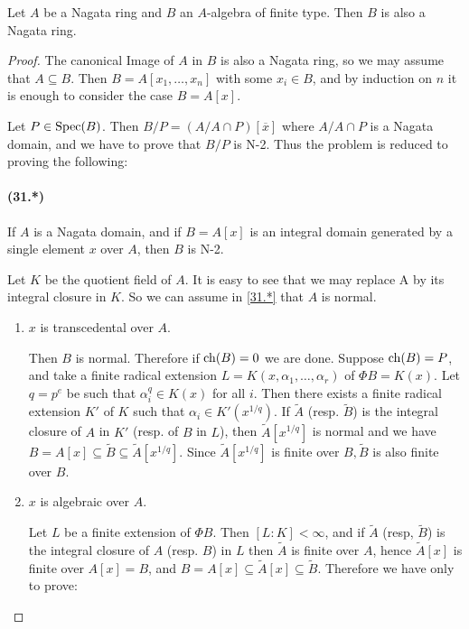 \documentclass[../main]{subfiles}
\begin{document}
\begin{partheorem}[Nagata]\label{thm:072}
Let $A$ be a Nagata ring and $B$ an $A$-algebra of finite type. Then $B$ is also a Nagata ring.
\end{partheorem} 
\begin{proof}
The canonical Image of $A$ in $B$ is also a Nagata ring, so we may assume that $A \subseteq B$. Then $B=A[x_{1}, \ldots, x_{n}]$ with some $x_{i} \in B$, and by induction on $n$ it is enough to consider the case $B=A[x]$.


Let $P \in \operatorname{Spec}(B)$. Then $B / P=(A / A \cap P)[\overline{x}]$ where $A / A \cap P$ is a Nagata domain, and we have to prove that $B / P$ is N-2.
Thus the problem is reduced to proving the following:

\paragraph{(31.*)}\makeatletter{}\makeatother\label{31.*} If $A$ is a Nagata domain, and if $B=A[x]$ is an integral domain generated by a single element $x$ over $A$, then $B$ is N-2.

Let $K$ be the quotient field of $A$. It is easy to see that we may replace A by its integral closure in $K$. So we can assume in \ref{31.*} that $A$ is normal.
\begin{enumerate}
    \item[Case 1.] $x$ is transcedental over $A$.

Then $B$ is normal. Therefore if $\operatorname{ch}(B)=0$ we are done.
Suppose $\operatorname{ch}(B)=P$, and take a finite radical extension $L= K(x, \alpha_{1}, \ldots, \alpha_{r})$ of $\Phi B=K(x)$. Let $q=p^{e}$ be such that $\alpha_{i}^{q} \in K(x)$ for all $i$. Then there exists a finite radical extension $K'$ of $K$ such that $\alpha_{i} \in K'(x^{1 / q})$. If $\widetilde{A}$ (resp. $\widetilde{B}$) is the integral closure of $A$ in $K'$ (resp. of $B$ in $L$), then $\widetilde{A}[x^{1 / q}]$ is normal and we have $B=A[x] \subseteq \widetilde{B} \subseteq \widetilde{A}[x^{1 / q}]$. Since $\widetilde{A}[x^{1 / q}]$ is finite over $B, \widetilde{B}$ is also finite over $B$.

 \item[Case 2.] $x$ is algebraic over $A$.

Let $L$ be a finite extension of $\Phi B$. Then $[L: K]<\infty$, and if $\widetilde{A}$ (resp, $\widetilde{B}$) is the integral closure of $A$ (resp. $B$) in $L$ then $\widetilde{A}$ is finite over $A$, hence $\widetilde{A}[x]$ is finite over $A[x]=B$, and $B=A[x] \subseteq \widetilde{A}[x] \subseteq \widetilde{B}$. Therefore we have only to prove:

\end{enumerate}
\end{proof}
\end{document}
